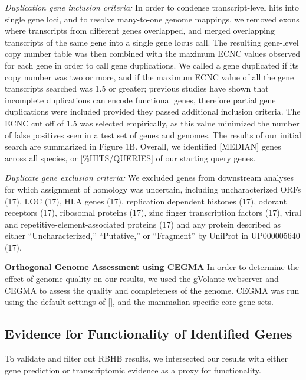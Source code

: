 \documentclass[10pt,letterpaper]{article}
\begin{document}
\emph{Duplication gene inclusion criteria:} In order to condense
transcript-level hits into single gene loci, and to resolve many-to-one
genome mappings, we removed exons where transcripts from different genes
overlapped, and merged overlapping transcripts of the same gene into a
single gene locus call. The resulting gene-level copy number table was
then combined with the maximum ECNC values observed for each gene in
order to call gene duplications. We called a gene duplicated if its copy
number was two or more, and if the maximum ECNC value of all the gene
transcripts searched was 1.5 or greater; previous studies have shown
that incomplete duplications can encode functional genes, therefore
partial gene duplications were included provided they passed additional
inclusion criteria. The ECNC cut off of 1.5 was selected empirically, as
this value minimized the number of false positives seen in a test set of
genes and genomes. The results of our initial search are summarized in
Figure 1B. Overall, we identified {[}MEDIAN{]} genes across all species,
or {[}\%HITS/QUERIES{]} of our starting query genes.

\emph{Duplicate gene exclusion criteria:} We excluded genes from
downstream analyses for which assignment of homology was uncertain,
including uncharacterized ORFs (17), LOC (17), HLA genes (17),
replication dependent histones (17), odorant receptors (17), ribosomal
proteins (17), zinc finger transcription factors (17), viral and
repetitive-element-associated proteins (17) and any protein described as
either ``Uncharacterized,'' ``Putative,'' or ``Fragment'' by UniProt in
UP000005640 (17).

\textbf{Orthogonal Genome Assessment using CEGMA} In order to determine
the effect of genome quality on our results, we used the gVolante
webserver and CEGMA to assess the quality and completeness of the
genome. CEGMA was run using the default settings of {[}{]}, and the
mammalian-specific core gene sets.

\hypertarget{evidence-for-functionality-of-identified-genes}{%
\subsection{Evidence for Functionality of Identified
Genes}\label{evidence-for-functionality-of-identified-genes}}

To validate and filter out RBHB results, we intersected our results with
either gene prediction or transcriptomic evidence as a proxy for
functionality.
\end{document}
